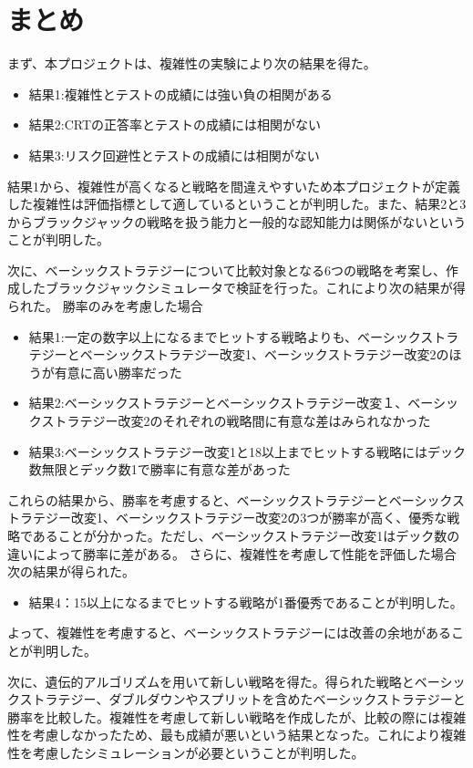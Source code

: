 \section{まとめ}
まず、本プロジェクトは、複雑性の実験により次の結果を得た。
\begin{itemize}
    \item 結果1:複雑性とテストの成績には強い負の相関がある
    \item 結果2:CRTの正答率とテストの成績には相関がない
    \item 結果3:リスク回避性とテストの成績には相関がない
\end{itemize}

結果1から、複雑性が高くなると戦略を間違えやすいため本プロジェクトが定義した複雑性は評価指標として適しているということが判明した。また、結果2と3からブラックジャックの戦略を扱う能力と一般的な認知能力は関係がないということが判明した。

次に、ベーシックストラテジーについて比較対象となる6つの戦略を考案し、作成したブラックジャックシミュレータで検証を行った。これにより次の結果が得られた。
勝率のみを考慮した場合
\begin{itemize}
\item 結果1:一定の数字以上になるまでヒットする戦略よりも、ベーシックストラテジーとベーシックストラテジー改変1、ベーシックストラテジー改変2のほうが有意に高い勝率だった
\item 結果2:ベーシックストラテジーとベーシックストラテジー改変１、ベーシックストラテジー改変2のそれぞれの戦略間に有意な差はみられなかった
\item 結果3:ベーシックストラテジー改変1と18以上までヒットする戦略にはデック数無限とデック数1で勝率に有意な差があった
\end{itemize}

これらの結果から、勝率を考慮すると、ベーシックストラテジーとベーシックストラテジー改変1、ベーシックストラテジー改変2の3つが勝率が高く、優秀な戦略であることが分かった。ただし、ベーシックストラテジー改変1はデック数の違いによって勝率に差がある。
さらに、複雑性を考慮して性能を評価した場合次の結果が得られた。
\begin{itemize}
\item 結果4：15以上になるまでヒットする戦略が1番優秀であることが判明した。
\end{itemize}

よって、複雑性を考慮すると、ベーシックストラテジーには改善の余地があることが判明した。

次に、遺伝的アルゴリズムを用いて新しい戦略を得た。得られた戦略とベーシックストラテジー、ダブルダウンやスプリットを含めたベーシックストラテジーと勝率を比較した。複雑性を考慮して新しい戦略を作成したが、比較の際には複雑性を考慮しなかったため、最も成績が悪いという結果となった。これにより複雑性を考慮したシミュレーションが必要ということが判明した。

